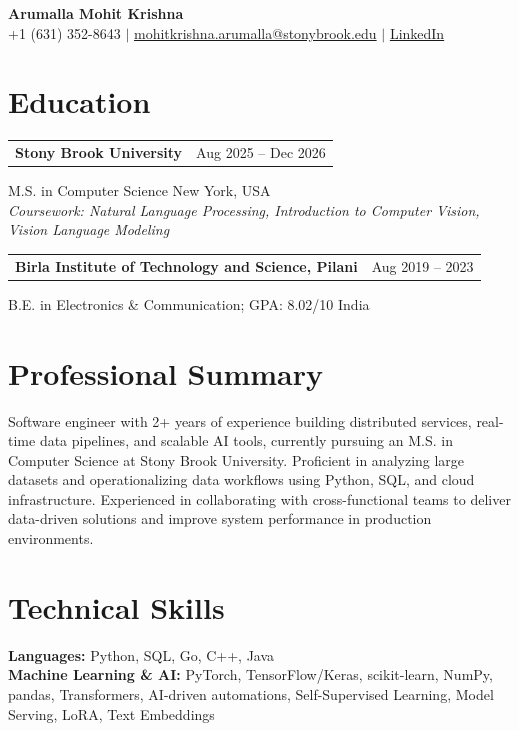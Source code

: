 \documentclass[letterpaper,10pt]{article}
\makeatletter
\newcommand{\entry}[2]{%
  \noindent
  \begin{tabularx}{\linewidth}
    {@{}>{\raggedright\arraybackslash}X@{\hspace{6pt}}r@{}}
    \textbf{#1} & #2
  \end{tabularx}\par
}
\makeatother
\begin{document}
\begin{center}
    {\LARGE\bfseries Arumalla Mohit Krishna}\\[3pt]
    +1 (631) 352-8643 $|$
    \href{mailto:mohitkrishna.arumalla@stonybrook.edu}
    {mohitkrishna.arumalla@stonybrook.edu} $|$
    \href{https://linkedin.com/in/mohit-krishna-arumalla}
    {LinkedIn}
\end{center}
\vspace{-8pt}

\section{Education}

\entry
  {\textbf{Stony Brook University}}
  {Aug 2025 -- Dec 2026}

M.S. in Computer Science \hfill New York, USA\\
\textit{
Coursework: Natural Language Processing,
Introduction to Computer Vision, Vision Language Modeling
}
\vspace{3pt}

\entry
  {\textbf{Birla Institute of Technology and Science, Pilani}}
  {Aug 2019 -- 2023}

B.E. in Electronics \& Communication; GPA: 8.02/10 \hfill India
\section{Professional Summary}

Software engineer with 2+ years of experience building distributed services,
real-time data pipelines, and scalable AI tools, currently pursuing an M.S. in Computer
Science at Stony Brook University. Proficient in analyzing large datasets
and operationalizing data workflows using Python, SQL, and cloud infrastructure.
Experienced in collaborating with cross-functional teams to deliver data-driven solutions
and improve system performance in production environments.

\section{Technical Skills}

\textbf{Languages:}
Python, SQL, Go, C++, Java\\

\textbf{Machine Learning \& AI:}
PyTorch, TensorFlow/Keras, scikit-learn, NumPy, pandas,
Transformers, AI-driven automations,
Self-Supervised Learning, Model Serving, LoRA, Text Embeddings\\
\end{document}
